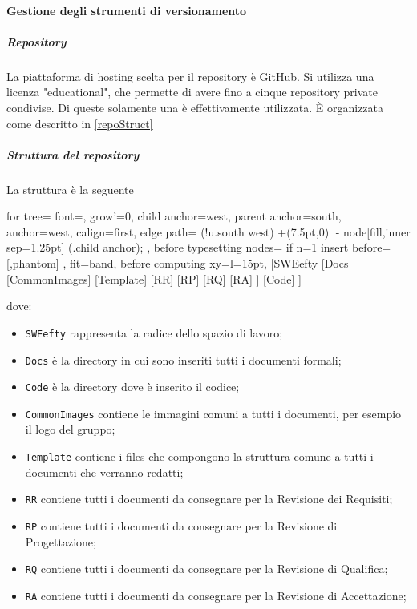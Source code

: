 		\paragraph{Gestione degli strumenti di versionamento}
			\subparagraph{Repository} \Spazio
			La piattaforma di hosting scelta per il repository è GitHub. Si utilizza una licenza "educational", che permette di avere fino a cinque repository private condivise. Di queste solamente una è effettivamente utilizzata. È organizzata come descritto in \ref{repoStruct}
			\subparagraph{Struttura del repository}\Spazio
			\label{repoStruct}
			La struttura è la seguente\\
			\begin{center}
			\begin{forest}
				for tree={
					font=\ttfamily,
					grow'=0,
					child anchor=west,
					parent anchor=south,
					anchor=west,
					calign=first,
					edge path={
						\noexpand{}
						(!u.south west) +(7.5pt,0) |- node[fill,inner sep=1.25pt] {} (.child anchor);
					},
					before typesetting nodes={
						if n=1
						{insert before={[,phantom]}}
						{}
					},
					fit=band,
					before computing xy={l=15pt},
				}
				[SWEefty
					[Docs
						[CommonImages]
						[Template]
						[RR]
						[RP]
						[RQ]
						[RA]
					]
					[Code]
				]
			\end{forest}
			\end{center}
			dove:
			\begin{itemize}
				\item \texttt{SWEefty} rappresenta la radice dello spazio di lavoro;
				\item \texttt{Docs} è la directory in cui sono inseriti tutti i documenti formali;
				\item \texttt{Code} è la directory dove è inserito il codice;
				\item \texttt{CommonImages} contiene le immagini comuni a tutti i documenti, per esempio il logo del gruppo;
				\item \texttt{Template} contiene i files che compongono la struttura comune a tutti i documenti che verranno redatti;
				\item \texttt{RR} contiene tutti i documenti da consegnare per la Revisione dei Requisiti;
				\item \texttt{RP} contiene tutti i documenti da consegnare per la Revisione di Progettazione;
				\item \texttt{RQ} contiene tutti i documenti da consegnare per la Revisione di Qualifica;
				\item \texttt{RA} contiene tutti i documenti da consegnare per la Revisione di Accettazione;	
			\end{itemize}
			
